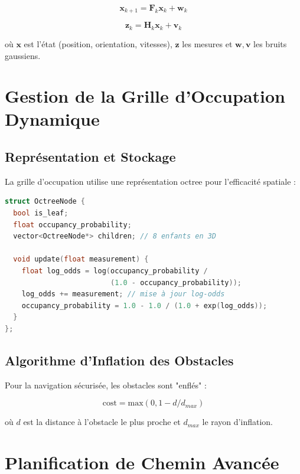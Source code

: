 \documentclass[12pt,a4paper,oneside]{report}
\begin{document}
\begin{equation}
\mathbf{x}_{k+1} = \mathbf{F}_k \mathbf{x}_k + \mathbf{w}_k
\end{equation}

\begin{equation}
\mathbf{z}_k = \mathbf{H}_k \mathbf{x}_k + \mathbf{v}_k
\end{equation}

où $\mathbf{x}$ est l'état (position, orientation, vitesses), $\mathbf{z}$ les mesures et $\mathbf{w}, \mathbf{v}$ les bruits gaussiens.

\section{Gestion de la Grille d'Occupation Dynamique}

\subsection{Représentation et Stockage}

La grille d'occupation utilise une représentation octree pour l'efficacité spatiale :

\begin{lstlisting}[language=C++]
struct OctreeNode {
  bool is_leaf;
  float occupancy_probability;
  vector<OctreeNode*> children; // 8 enfants en 3D
  
  void update(float measurement) {
    float log_odds = log(occupancy_probability / 
                         (1.0 - occupancy_probability));
    log_odds += measurement; // mise à jour log-odds
    occupancy_probability = 1.0 - 1.0 / (1.0 + exp(log_odds));
  }
};
\end{lstlisting}

\subsection{Algorithme d'Inflation des Obstacles}

Pour la navigation sécurisée, les obstacles sont "enflés" :

\begin{equation}
\text{cost} = \text{max}(0, 1 - d / d_{max})
\end{equation}

où $d$ est la distance à l'obstacle le plus proche et $d_{max}$ le rayon d'inflation.

\section{Planification de Chemin Avancée}
\end{document}
